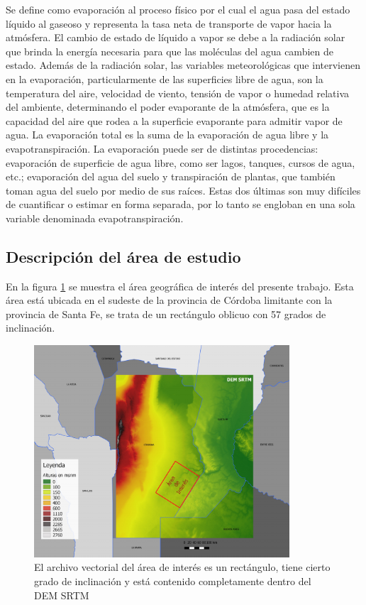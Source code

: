 \documentclass[10pt,a4paper, twoside]{report}
\begin{document}
Se define como evaporación al proceso físico por el cual el agua pasa del estado líquido al gaseoso y representa la tasa neta de transporte de vapor hacia la atmósfera. El cambio de estado de líquido a vapor se debe a la radiación solar que brinda la energía necesaria para que las moléculas del agua cambien de estado. Además de la radiación solar, las variables meteorológicas que intervienen en la evaporación, particularmente de las superficies libre de agua, son la temperatura del aire, velocidad de viento, tensión de vapor o humedad relativa del ambiente, determinando el poder evaporante de la atmósfera, que es la capacidad del aire que rodea a la superficie evaporante para admitir vapor de agua. La evaporación total es la suma de la evaporación de agua libre y la evapotranspiración. La evaporación puede ser de distintas procedencias: evaporación de superficie de agua libre, como ser lagos, tanques, cursos de agua, etc.; evaporación del agua del suelo y transpiración de plantas, que también toman agua del suelo por medio de sus raíces. Estas dos últimas son muy difíciles de cuantificar o estimar en forma separada, por lo tanto se engloban en una sola variable denominada evapotranspiración.

\subsection{Descripción del área de estudio}
\label{subsec:introModelo}

En la figura \ref{SRTMAndShape} se muestra el área geográfica de interés del presente trabajo. Esta área está ubicada en el sudeste de la provincia de Córdoba limitante con la provincia de Santa Fe, se trata de un rectángulo oblicuo con 57 grados de inclinación.

\begin{figure}[!htb]
   \centering      
   \includegraphics[width=0.85\textwidth]{imagenes/SRTMOriginalAndShape4.pdf}
 \caption{El archivo vectorial del área de interés es un rectángulo, tiene cierto grado de inclinación y está contenido completamente dentro del DEM SRTM}
 \label{SRTMAndShape}
\end{figure}
\end{document}
